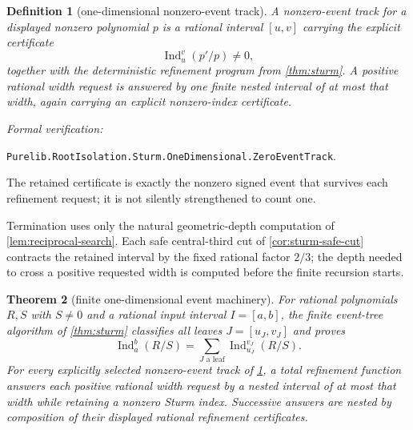 \documentclass[11pt]{article}
\newtheorem{theorem}{Theorem}[section]
\newtheorem{definition}[theorem]{Definition}
\newcommand{\Ind}{\operatorname{Ind}}
\newcommand{\leanref}[1]{\par\smallskip\noindent
  \emph{Formal verification:}\par\nobreak
  {\raggedright\nolinkurl{#1}.\par}}
\begin{document}
\begin{definition}[one-dimensional nonzero-event track]
\label{def:one-dimensional-track}
A nonzero-event track for a displayed nonzero polynomial $p$ is a rational
interval $[u,v]$ carrying the explicit certificate
\[
                         \Ind_u^v(p'/p)\ne0,
\]
together with the deterministic refinement program from
\cref{thm:sturm}.  A positive rational width request is answered by one
finite nested interval of at most that width, again carrying an explicit
nonzero-index certificate.
\end{definition}

\leanref{Purelib.RootIsolation.Sturm.OneDimensional.ZeroEventTrack}

The retained certificate is exactly the nonzero signed event that survives
each refinement request; it is not silently strengthened to count one.

Termination uses only the natural geometric-depth computation of
\cref{lem:reciprocal-search}.  Each safe
central-third cut of \cref{cor:sturm-safe-cut} contracts the retained
interval by the fixed rational factor $2/3$;
the depth needed to cross a positive requested width is computed before the
finite recursion starts.

\begin{theorem}[finite one-dimensional event machinery]
\label{thm:1d-isolation}
For rational polynomials $R,S$ with $S\ne0$ and a rational input interval
$I=[a,b]$, the finite event-tree algorithm of \cref{thm:sturm} classifies
all leaves $J=[u_J,v_J]$ and proves
\[
 \Ind_a^b(R/S)
   =\sum_{J\text{ a leaf}}\Ind_{u_J}^{v_J}(R/S).
\]
For every explicitly selected nonzero-event track of
\cref{def:one-dimensional-track}, a total refinement function answers each
positive rational width request by a nested interval of at most that width
while retaining a nonzero Sturm index.  Successive answers are nested by
composition of their displayed rational refinement certificates.
\end{theorem}
\end{document}
